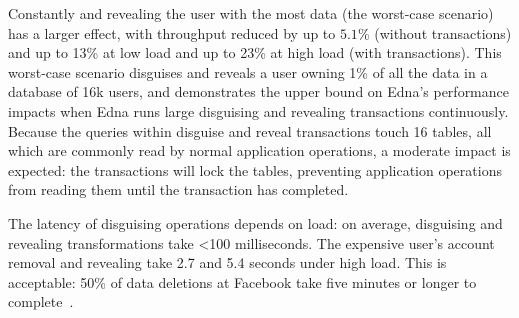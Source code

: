 %
Constantly \xxing and revealing the user with the most data (the worst-case
scenario) has a larger effect, with throughput reduced by up to $5.1$\% (without
transactions) and up to 13\% at low load and up to 23\% at high load (with
transactions).
%
%
%
This worst-case scenario disguises and reveals a user owning 1\% of all the data
in a database of 16k users, and demonstrates the upper bound on Edna’s
performance impacts when Edna runs large disguising and revealing transactions
continuously.  Because the queries within disguise and reveal transactions touch
16 tables, all which are commonly read by normal application operations, a
moderate impact is expected: the transactions will lock the tables, preventing
application operations from reading them until the transaction has completed. 

%
%
%

The latency of disguising operations depends on load: on average, disguising and
revealing transformations take <100 milliseconds.  The expensive user's account
removal and revealing take 2.7 and 5.4 seconds under high load. 
%
%
This is acceptable: 50\% of data deletions at Facebook take five minutes or
longer to complete~\cite{delf}.
%

